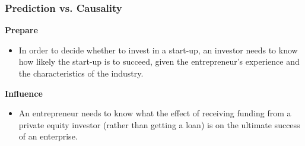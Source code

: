 \documentclass[
  shownotes,
  xcolor={svgnames},
  hyperref={colorlinks,citecolor=DarkBlue,linkcolor=andesred,urlcolor=DarkBlue}
  , aspectratio=169]{beamer}
\begin{document}
\begin{frame}
\frametitle{Prediction vs. Causality}



\begin{minipage}[t]{0.45\linewidth}
       \begin{center}
        {\bf Prepare}
       \end{center}
       

       \begin{itemize}
       \item In order to decide whether to invest in a start-up, an investor needs to know how likely the start-up is to succeed, given the entrepreneur's experience and the characteristics of the industry.
       \end{itemize}
    \end{minipage}
    \hfill
    \begin{minipage}[t]{0.45\linewidth}%
    \begin{center}
        {\bf Influence}
       \end{center}
        

       \begin{itemize}
       \item An entrepreneur needs to know what the effect of receiving funding from a private equity investor (rather than getting a loan) is on the ultimate success of an enterprise.
       \end{itemize}
    
    \end{minipage}



\end{frame}
\end{document}
